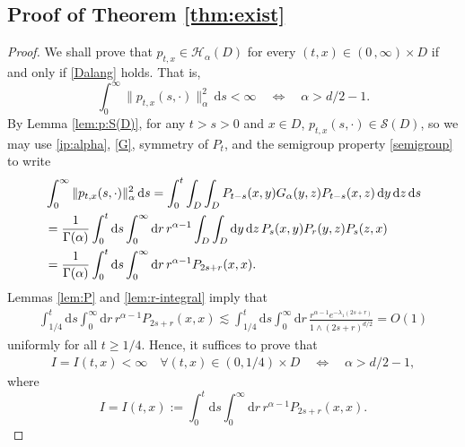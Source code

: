 \documentclass[reqno]{amsart}
\renewcommand{\d}{\mathrm d}
\newcommand{\1}{\mathbf 1}
\numberwithin{equation}{section}
\theoremstyle{definition}
\begin{document}
\subsection{Proof of Theorem \ref{thm:exist}}

\begin{proof}
We shall prove that $p_{t,x} \in \mathcal{H}_\alpha(D)$ for every $(t,x) \in (0\,,\infty) \times D$ if and only if \eqref{Dalang} holds. That is,
\[
	\int_0^\infty \|p_{t,x}(s,\cdot)\|_\alpha^2 \, \d s < \infty 
	\quad \Leftrightarrow \quad 
	\alpha>d/2-1.
\]
By Lemma \ref{lem:p:S(D)}, for any $t>s>0$ and $x \in D$, $p_{t,x}(s,\cdot) \in \mathcal{S}(D)$, so we may use \eqref{ip:alpha}, \eqref{G}, symmetry of $P_t$, and the semigroup property \eqref{semigroup} to write
\begin{align}
	&\int_0^\infty \|p_{t,x}(s,\cdot)\|_\alpha^2 \, \d s
        = \int_0^t \int_D \int_D P_{t-s}(x,y) G_\alpha(y,z) P_{t-s}(x,z) \, \d y \, \d z \, \d s\notag \\
        & = \frac{1}{\Gamma(\alpha)} \int_0^t \d s \int_0^\infty \d r \, r^{\alpha-1} \int_D \int_D \d y\, \d z\, P_s(x,y) P_r(y,z) P_s(z,x)\notag \\
        & = \frac{1}{\Gamma(\alpha)} \int_0^t \d s \int_0^\infty \d r \, r^{\alpha-1} P_{2s+r}(x,x).
        \label{int:p:norm-sq}
\end{align}
Lemmas \ref{lem:P} and \ref{lem:r-integral} imply that
\begin{align}
	\int_{1/4}^t \d s \int_0^\infty \d r \, r^{\alpha-1} P_{2s+r}(x,x) \lesssim \int_{1/4}^t \d s \int_0^\infty \d r \, \frac{r^{\alpha-1} e^{-\lambda_1(2s+r)}}{1 \wedge (2s+r)^{d/2}} =O(1)
\end{align}
uniformly for all $t \ge 1/4$.
Hence, it suffices to prove that
\begin{align}\label{I:finite}
	I=I(t,x) < \infty \quad \forall (t,x)\in (0,1/4)\times D
	\quad \Leftrightarrow \quad
	\alpha>d/2-1,
\end{align}
where
\[
	I=I(t,x):=\int_0^t \d s \int_0^\infty \d r \, r^{\alpha-1} P_{2s+r}(x,x).
\]

\end{proof}
\end{document}
